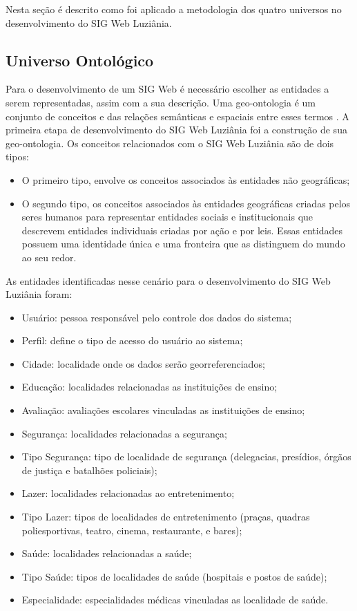Nesta seção é descrito como foi aplicado a metodologia dos quatro universos no desenvolvimento do SIG Web Luziânia.

\subsection{Universo Ontológico}
\label{universo-ontologico}

Para o desenvolvimento de um SIG Web é necessário escolher as entidades a serem representadas, assim com a sua descrição. Uma geo-ontologia é um conjunto de conceitos e das relações semânticas e espaciais entre esses termos \cite{gisasp}. A primeira etapa de desenvolvimento do SIG Web Luziânia foi a construção de sua geo-ontologia. Os conceitos relacionados com o SIG Web Luziânia são de dois tipos:

\begin{itemize}
\item O primeiro tipo, envolve os conceitos associados às entidades não geográficas;
\item O segundo tipo, os conceitos associados às entidades geográficas criadas pelos seres humanos para representar entidades sociais e institucionais que descrevem entidades individuais criadas por ação e por leis. Essas entidades possuem uma identidade única e uma fronteira que as distinguem do mundo ao seu redor.
\end{itemize}
	
As entidades identificadas nesse cenário para o desenvolvimento do SIG Web Luziânia foram: 

\begin{itemize}
\item Usuário: pessoa responsável pelo controle dos dados do sistema;
\item Perfil: define o tipo de acesso do usuário ao sistema;
\item Cidade: localidade onde os dados serão georreferenciados;
\item Educação: localidades relacionadas as instituições de ensino;
\item Avaliação: avaliações escolares vinculadas as instituições de ensino;
\item Segurança: localidades relacionadas a segurança;
\item Tipo Segurança: tipo de localidade de segurança (delegacias, presídios, órgãos de justiça e batalhões policiais);
\item Lazer: localidades relacionadas ao entretenimento;
\item Tipo Lazer: tipos de localidades de entretenimento (praças, quadras poliesportivas, teatro, cinema, restaurante, e bares);
\item Saúde: localidades relacionadas a saúde;
\item Tipo Saúde: tipos de localidades de saúde (hospitais e postos de saúde);
\item Especialidade: especialidades médicas vinculadas as localidade de saúde.
\end{itemize}

